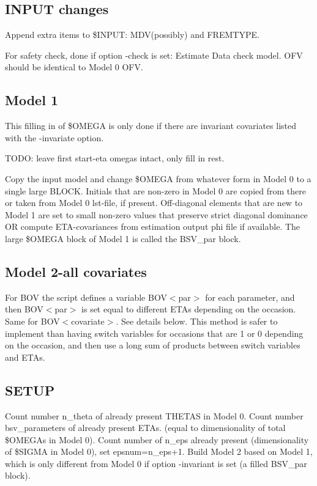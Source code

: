 \subsection{INPUT changes}
Append extra items to \$INPUT: MDV(possibly) and FREMTYPE.

For safety check, done if option -check is set: Estimate Data check model. OFV should be identical to Model 0 OFV.

\subsection{Model 1}
This filling in of \$OMEGA is only done if there are invariant covariates listed with the -invariate option.

TODO: leave first start-eta omegas intact, only fill in rest.

Copy the input model and change \$OMEGA from whatever form in Model 0 to a single large BLOCK. Initials that are non-zero in Model 0 are copied from there or taken from Model 0 lst-file, if present. Off-diagonal elements that are new to Model 1 are set to small non-zero values that preserve strict diagonal dominance OR compute ETA-covariances from estimation output phi file if available. 
The large \$OMEGA block of Model 1 is called the BSV\_par block.


\subsection{Model 2-all covariates}

For BOV the script defines a variable BOV$<$par$>$ for each parameter, and then BOV$<$par$>$ is set equal to different ETAs depending on the occasion. Same for BOV$<$covariate$>$. See details below. This method is safer to implement than having switch variables for occasions that are 1 or 0 depending on the occasion, and then use a long sum of products between switch variables and ETAs. 

\subsection{SETUP}
Count number n\_theta of already present THETAS in Model 0. Count number bsv\_parameters of already present ETAs. (equal to dimensionality of total \$OMEGAs in Model 0). Count number of n\_eps already present (dimensionality of \$SIGMA in Model 0), set epsnum=n\_eps+1.
Build Model 2 based on Model 1, which is only different from Model 0 if option -invariant is set (a filled BSV\_par block).

